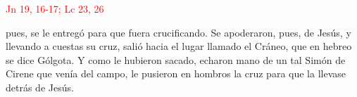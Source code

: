 \hfill\textcolor{red}{Jn 19, 16-17; Lc 23, 26}

pues, se le entregó para que fuera crucificando. Se apoderaron, pues, de Jesús, y llevando a cuestas su cruz, 
salió hacia el lugar llamado el Cráneo, que en hebreo se dice Gólgota. Y como le hubieron sacado, echaron mano de un tal Simón de Cirene que venía del campo, 
le pusieron en hombros la cruz para que la llevase detrás de Jesús.